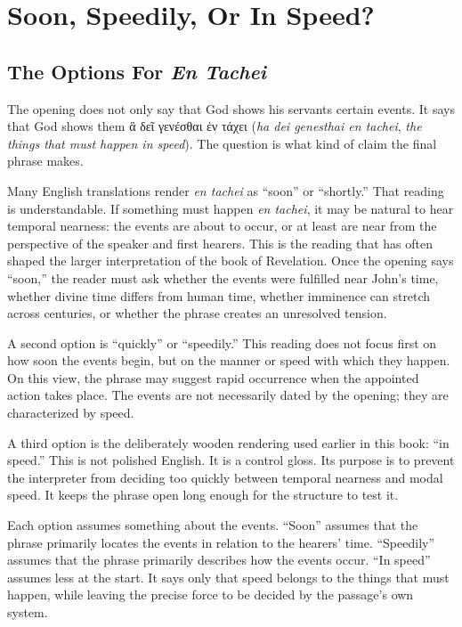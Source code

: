 \chapter{Soon, Speedily, Or In Speed?}

\section{The Options For \textit{En Tachei}}

The opening does not only say that God shows his servants certain events. It says that God shows them \textgreek{ἃ δεῖ γενέσθαι ἐν τάχει} (\textit{ha dei genesthai en tachei}, \textit{the things that must happen in speed}). The question is what kind of claim the final phrase makes.

Many English translations render \textit{en tachei} as ``soon'' or ``shortly.'' That reading is understandable. If something must happen \textit{en tachei}, it may be natural to hear temporal nearness: the events are about to occur, or at least are near from the perspective of the speaker and first hearers. This is the reading that has often shaped the larger interpretation of the book of Revelation. Once the opening says ``soon,'' the reader must ask whether the events were fulfilled near John's time, whether divine time differs from human time, whether imminence can stretch across centuries, or whether the phrase creates an unresolved tension.

A second option is ``quickly'' or ``speedily.'' This reading does not focus first on how soon the events begin, but on the manner or speed with which they happen. On this view, the phrase may suggest rapid occurrence when the appointed action takes place. The events are not necessarily dated by the opening; they are characterized by speed.

A third option is the deliberately wooden rendering used earlier in this book: ``in speed.'' This is not polished English. It is a control gloss. Its purpose is to prevent the interpreter from deciding too quickly between temporal nearness and modal speed. It keeps the phrase open long enough for the structure to test it.

Each option assumes something about the events. ``Soon'' assumes that the phrase primarily locates the events in relation to the hearers' time. ``Speedily'' assumes that the phrase primarily describes how the events occur. ``In speed'' assumes less at the start. It says only that speed belongs to the things that must happen, while leaving the precise force to be decided by the passage's own system.

